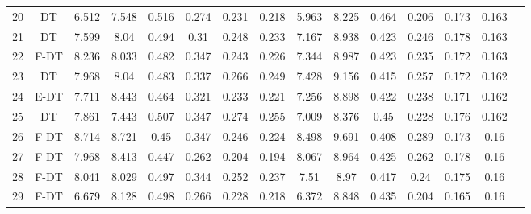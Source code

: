 \begin{longtable}{@{\hskip3pt}c@{\hskip3pt}c@{\hskip3pt}c@{\hskip3pt}c@{\hskip3pt}c@{\hskip3pt}c@{\hskip3pt}c@{\hskip3pt}c@{\hskip3pt}c@{\hskip3pt}c@{\hskip3pt}c@{\hskip3pt}c@{\hskip3pt}c@{\hskip3pt}c@{\hskip3pt}c}
         20 &             DT &             6.512 &       7.548 &           0.516 &           0.274 &           0.231 &           0.218 &               5.963 &       8.225 &           0.464 &         0.206 &          0.173 &           0.163 \\
         21 &             DT &             7.599 &        8.04 &           0.494 &            0.31 &           0.248 &           0.233 &               7.167 &       8.938 &           0.423 &         0.246 &          0.178 &           0.163 \\
         22 &           F-DT &             8.236 &       8.033 &           0.482 &           0.347 &           0.243 &           0.226 &               7.344 &       8.987 &           0.423 &         0.235 &          0.172 &           0.163 \\
         23 &             DT &             7.968 &        8.04 &           0.483 &           0.337 &           0.266 &           0.249 &               7.428 &       9.156 &           0.415 &         0.257 &          0.172 &           0.162 \\
         24 &           E-DT &             7.711 &       8.443 &           0.464 &           0.321 &           0.233 &           0.221 &               7.256 &       8.898 &           0.422 &         0.238 &          0.171 &           0.162 \\
         25 &             DT &             7.861 &       7.443 &           0.507 &           0.347 &           0.274 &           0.255 &               7.009 &       8.376 &            0.45 &         0.228 &          0.176 &           0.162 \\
         26 &           F-DT &             8.714 &       8.721 &            0.45 &           0.347 &           0.246 &           0.224 &               8.498 &       9.691 &           0.408 &         0.289 &          0.173 &            0.16 \\
         27 &           F-DT &             7.968 &       8.413 &           0.447 &           0.262 &           0.204 &           0.194 &               8.067 &       8.964 &           0.425 &         0.262 &          0.178 &            0.16 \\
         28 &           F-DT &             8.041 &       8.029 &           0.497 &           0.344 &           0.252 &           0.237 &                7.51 &        8.97 &           0.417 &          0.24 &          0.175 &            0.16 \\
         29 &           F-DT &             6.679 &       8.128 &           0.498 &           0.266 &           0.228 &           0.218 &               6.372 &       8.848 &           0.435 &         0.204 &          0.165 &            0.16 \\

\end{longtable}
